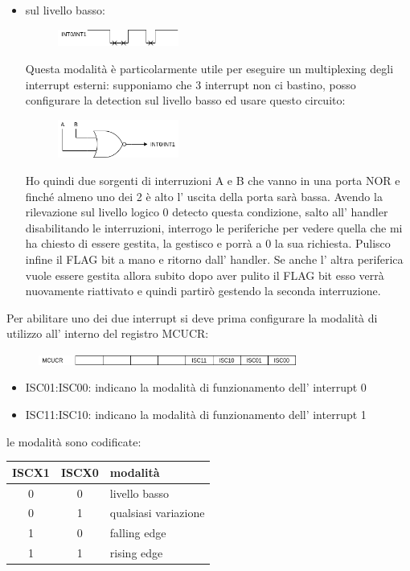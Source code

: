 \begin{itemize}
    \item sul livello basso:
        \begin{figure}[H]
            \centering
            \includegraphics[width=150px]{images/15_Interrupt/low_level.png}
        \end{figure}
        Questa modalità è particolarmente utile per eseguire un multiplexing degli interrupt esterni: supponiamo che 3 interrupt non ci bastino, posso configurare la detection sul livello basso ed usare questo circuito:
        \begin{figure}[H]
            \centering
            \includegraphics[width=150px]{images/15_Interrupt/interrupt_multiplexing.png}
        \end{figure}
        Ho quindi due sorgenti di interruzioni A e B che vanno in una porta NOR e finché almeno uno dei 2 è alto l' uscita  della porta sarà bassa.
        Avendo la rilevazione sul livello logico 0 detecto questa condizione, salto all' handler disabilitando le interruzioni, interrogo le periferiche per vedere quella che mi ha chiesto di essere gestita, la gestisco e porrà a 0 la sua richiesta. Pulisco infine il FLAG bit a mano e ritorno dall' handler.
        Se anche l' altra periferica vuole essere gestita allora subito dopo aver pulito il FLAG bit esso verrà nuovamente riattivato e quindi partirò gestendo la seconda interruzione.
\end{itemize}

Per abilitare uno dei due interrupt si deve prima configurare la modalità di utilizzo all' interno del registro MCUCR:
\begin{figure}[H]
    \centering
    \includegraphics[width=320px]{images/15_Interrupt/MCUCR.png}
\end{figure}
\begin{itemize}
    \item ISC01:ISC00: indicano la modalità di funzionamento dell' interrupt 0
    \item ISC11:ISC10: indicano la modalità di funzionamento dell' interrupt 1
\end{itemize}
le modalità sono codificate:
\begin{table}[ht!]
    \centering
    \begin{tabular}{c|c|l}
        ISCX1 & ISCX0 & modalità \\
        \hline
        0 & 0 & livello basso \\
        0 & 1 & qualsiasi variazione \\
        1 & 0 & falling edge \\
        1 & 1 & rising edge \\
    \end{tabular}
\end{table}

